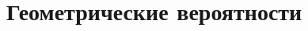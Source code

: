 \section{Геометрические вероятности}

\begin{comment}

\begin{problem}

Три бабочки капустницы садятся на круглый кочан капусты радиуса 1 случайным образом (имеется в виду, что место положение каждой бабочки -- с.в., равномерно распределенная на сфере) и независимо друг от друга. Если между двумя бабочками (геодезическое) расстояние оказывается меньше ${\pi \mathord{\left/ {\vphantom {\pi  2}} \right. \kern-\nulldelimiterspace} 2} $, то обе улетают. Найдите вероятность того, что на капусте сидят все три бабочки.

\end{problem}

\begin{problem}
Какова вероятность того, что $n$-угольник с вершинами, случайно расположенных на окружности, содержит ее центр?
\end{problem}

\begin{problem}
Найти среднюю длину секущих трехмерного куба с единичной длиной.
\end{problem}

\begin{problem}
Пусть в пространстве $\mathbb R^n$ с евклидовой нормой задан $n$-мерный шар единичного радиуса. Внутри него имеются две случайные точки с радиус-векторами ${\bf{r}}_1$ и ${\bf{r}}_2$ соответственно, имеющие равномерное пространственное распределение внутри шара. Найти распределение случайной величины, являющейся средним расстоянием между этими двумя точками $r = \left|{\bf r}_1 - {\bf r}_2\right|$.
\end{problem}

\begin{problem} (в 2х местах)
Пусть случайный вектор $X^{n} $ имеет равномерное распределение на единичной сфере в ${\mathbb R}^{n} $. Пусть $Y^{n} $ -- проекция $X^{n} $ на первую координатную ось. Докажите, что последовательность $\sqrt{n} Y^{n} $ сходится по распределению к стандартной нормальной случайной величине.

\begin{ordre} 
Показать сходимость по распределению нормы $X^{n} $ к единице. Воспользоваться соотношением
\[
P\{ \frac{\xi_1}{\xi_2} < x \} = \underset{t}{\int} P\{\xi_1 < xt \} f_{\xi_2}(t) dt
\] 
\end{ordre}
\end{problem}

\end{comment}

